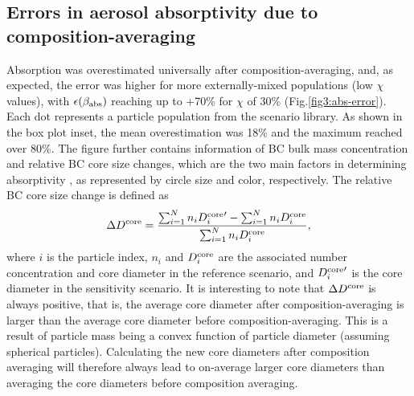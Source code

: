 \documentclass[edeposit,fullpage]{uiucthesis2009}
\begin{document}
\subsection{Errors in aerosol absorptivity due to composition-averaging}
Absorption was overestimated universally after composition-averaging,
and, as expected, the error was higher for more externally-mixed
populations (low $\chi$ values), with $\epsilon(\beta_{\rm abs})$
reaching up to +70\% for $\chi$ of 30\%
(Fig.\ref{fig3:abs-error}). Each dot represents a particle population
from the scenario library. As shown in the box plot inset, the mean
overestimation was 18\% and the maximum reached over 80\%. The figure
further contains information of BC bulk mass concentration and
relative BC core size changes, which are the two main factors in
determining absorptivity \citep{Bond2006a}, as represented by circle
size and color, respectively. The relative BC core size change is
defined as
\begin{equation}
    \displaystyle \Delta{D^{\rm core}}=\frac{\sum_{i=1}^{N} n_i {D_i^{\rm core}}' - \sum_{i=1}^{N} n_i {D_i^{\rm core}}}{\sum_{i=1}^{N} n_i D_i^{\rm core}},
\end{equation}
where $i$ is the particle index, $n_i$ and $D_i^{\rm core}$ are the
associated number concentration and core diameter in the reference
scenario, and ${D_i^{\rm core}}'$ is the core diameter in the
sensitivity scenario. It is interesting to note that $\Delta
D^{\rm core}$ is always positive, that is, the average core diameter
after composition-averaging is larger than the average core diameter
before composition-averaging. This is a result of particle mass being
a convex function of particle diameter (assuming spherical
particles). Calculating the new core diameters after composition
averaging will therefore always lead to on-average larger core
diameters than averaging the core diameters before composition
averaging.
\end{document}
